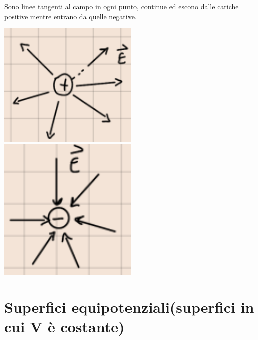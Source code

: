 \documentclass[a4paper, 12pt]{book}
\theoremstyle{plain}
\begin{document}
Sono linee tangenti al campo in ogni punto, continue ed escono dalle cariche positive mentre entrano da quelle negative.

\begin{center}
	\includegraphics[width=0.5\textwidth]{left.png}
	\includegraphics[width=0.5\textwidth]{right.png}
\end{center}

\section{Superfici equipotenziali(superfici in cui V è costante)}
	
\end{document}

